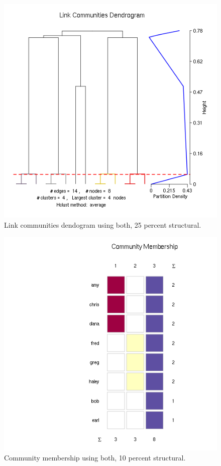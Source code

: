 \documentclass{report}
\begin{document}
\begin{figure}[htp!]
  \centering
  \includegraphics[width=0.65\linewidth]{toy2/ea/lc_0.25.png}
  \caption{Link communities dendogram using both, 25 percent structural.}
\end{figure}

\begin{figure}[htp!]
  \centering
  \includegraphics[width=0.65\linewidth]{toy2/ea/top20_0.1.png}
  \caption{Community membership using both, 10 percent structural.}
\end{figure}
\end{document}
